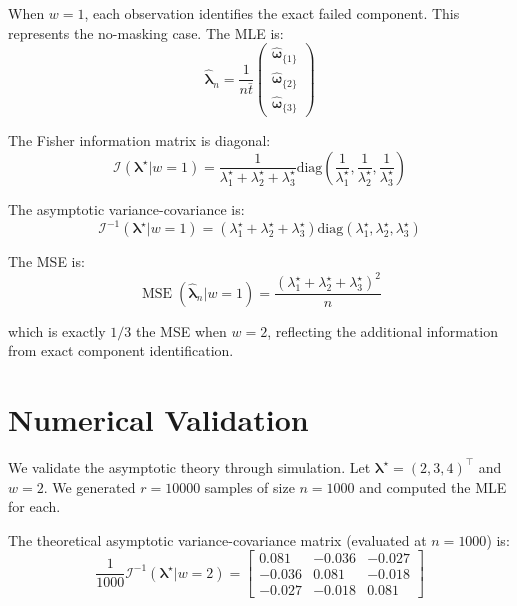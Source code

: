 \documentclass[12pt]{article}
\newcommand{\tparam}[1]{{#1}^{\star}}  %
\newcommand{\expomle}{\boldsymbol{\hat{\lambda}}_n}
\newcommand{\infomatrx}{\mathcal{I}}
\newcommand{\cntsymb}{\boldsymbol{\hat\omega}}
\newcommand{\cnt}[1]{\cntsymb_{\{#1\}}}
\renewcommand{\vec}[1]{\boldsymbol{#1}}
\DeclareMathOperator{\MSE}{\mathrm{MSE}}
\theoremstyle{definition}
\begin{document}
When $w=1$, each observation identifies the exact failed component. This represents the no-masking case. The MLE is:
\begin{equation}
\expomle = \frac{1}{n\bar{t}} \begin{pmatrix} \cnt{1}\\ \cnt{2}\\ \cnt{3} \end{pmatrix}
\end{equation}

The Fisher information matrix is diagonal:
\begin{equation}
\infomatrx(\tparam{\vec{\lambda}} | w=1) = \frac{1}{\tparam{\lambda}_1 + \tparam{\lambda}_2 + \tparam{\lambda}_3} \text{diag}\left(\frac{1}{\tparam{\lambda}_1}, \frac{1}{\tparam{\lambda}_2}, \frac{1}{\tparam{\lambda}_3}\right)
\end{equation}

The asymptotic variance-covariance is:
\begin{equation}
\infomatrx^{-1}(\tparam{\vec{\lambda}} | w=1) = (\tparam{\lambda}_1 + \tparam{\lambda}_2 + \tparam{\lambda}_3) \text{diag}(\tparam{\lambda}_1, \tparam{\lambda}_2, \tparam{\lambda}_3)
\end{equation}

The MSE is:
\begin{equation}
\MSE(\expomle | w=1) = \frac{(\tparam{\lambda}_1 + \tparam{\lambda}_2 + \tparam{\lambda}_3)^2}{n}
\end{equation}

which is exactly $1/3$ the MSE when $w=2$, reflecting the additional information from exact component identification.

\section{Numerical Validation}

We validate the asymptotic theory through simulation. Let $\tparam{\vec{\lambda}} = (2, 3, 4)^\top$ and $w=2$. We generated $r=10000$ samples of size $n=1000$ and computed the MLE for each.

The theoretical asymptotic variance-covariance matrix (evaluated at $n=1000$) is:
\begin{equation}
\frac{1}{1000}\infomatrx^{-1}(\tparam{\vec{\lambda}} | w=2) = \begin{bmatrix}
0.081 & -0.036 & -0.027\\
-0.036 & 0.081 & -0.018\\
-0.027 & -0.018 & 0.081
\end{bmatrix}
\end{equation}
\end{document}
